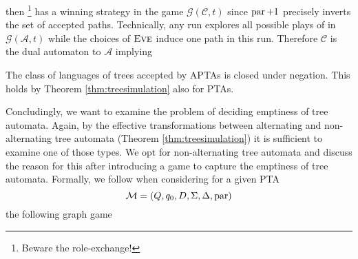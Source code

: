then \eve{}\footnote{Beware the role-exchange!} has a winning strategy in the 
game $\mathcal{G}(\mathcal{C}, t)$ since $\operatorname{par} + 1$ precisely inverts the
set of accepted paths. Technically, any run explores all possible plays of 
\adam{} in $\mathcal{G}(\mathcal{A}, t)$ while the choices of $\textsc{Eve}{}$ induce
one path in this run. Therefore $\mathcal{C}$ is the dual automaton to 
$\mathcal{A}$ implying
\begin{proposition}
  The class of languages of trees accepted by \acp{APTA} is closed under
  negation. This holds by Theorem \ref{thm:treesimulation} also for \acp{PTA}.
  \label{prop:atanegation}
\end{proposition}

Concludingly, we want to examine the problem of deciding emptiness of tree
automata. Again, by the effective transformations between alternating and
non-alternating tree automata (Theorem \ref{thm:treesimulation}) it is
sufficient to examine one of those types. We opt for non-alternating tree
automata and discuss the reason for this after introducing a game to capture
the emptiness of tree automata. Formally, we follow 
\cite[Proof of Theorem 23]{ParityGamesPosDet} when considering for a given
\ac{PTA}
\begin{equation*}
  \mathcal{M} = \left(Q, q_{0}, D, \Sigma, \Delta, \operatorname{par}\right)
\end{equation*}
the following graph game
